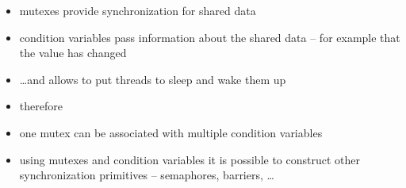 
\begin{slide}
\begin{itemize}
\item mutexes provide synchronization for shared data
\item condition variables pass information about the shared data --
for example that the value has changed
\item \dots{}and allows to put threads to sleep and wake them up
\item therefore 
\item one mutex can be associated with multiple condition variables
\item using mutexes and condition variables it is possible to construct
other synchronization primitives -- semaphores, barriers, \dots
\end{itemize}
\end{slide}

\label{CONDITION_VARIABLES}

